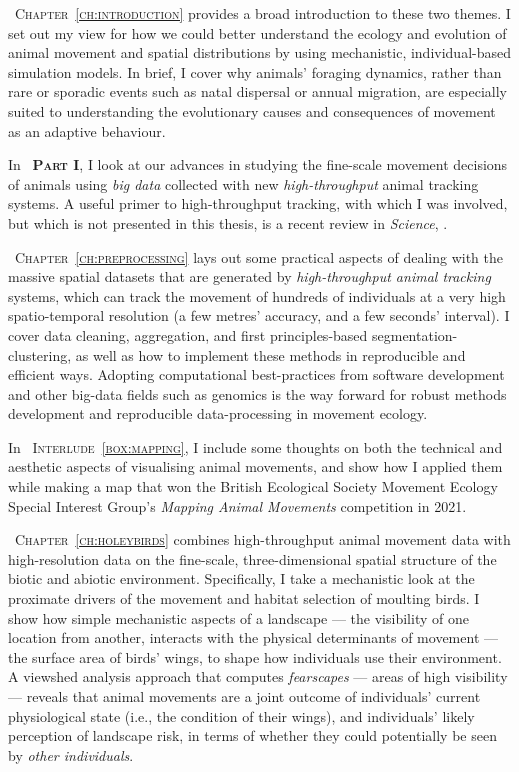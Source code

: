 {\scshape~Chapter~\ref{ch:introduction}} provides a broad introduction to these two themes.
I set out my view for how we could better understand the ecology and evolution of animal movement and spatial distributions by using mechanistic, individual-based simulation models.
In brief, I cover why animals' foraging dynamics, rather than rare or sporadic events such as natal dispersal or annual migration, are especially suited to understanding the evolutionary causes and consequences of movement as an adaptive behaviour.


\medskip

In {\scshape~\textbf{Part I}}, I look at our advances in studying the fine-scale movement decisions of animals using \textit{big data} collected with new \textit{high-throughput} animal tracking systems.
A useful primer to high-throughput tracking, with which I was involved, but which is not presented in this thesis, is a recent review in \textit{Science},  .

\medskip

{\scshape~Chapter~\ref{ch:preprocessing}} lays out some practical aspects of dealing with the massive spatial datasets that are generated by \textit{high-throughput animal tracking} systems, which can track the movement of hundreds of individuals at a very high spatio-temporal resolution (a few metres' accuracy, and a few seconds' interval).
I cover data cleaning, aggregation, and first principles-based segmentation-clustering, as well as how to implement these methods in reproducible and efficient ways.
Adopting computational best-practices from software development and other big-data fields such as genomics is the way forward for robust methods development and reproducible data-processing in movement ecology.

\medskip

In {\scshape~Interlude~\ref{box:mapping}}, I include some thoughts on both the technical and aesthetic aspects of visualising animal movements, and show how I applied them while making a map that won the British Ecological Society Movement Ecology Special Interest Group's \emph{Mapping Animal Movements} competition in 2021.

\medskip

{\scshape~Chapter~\ref{ch:holeybirds}} combines high-throughput animal movement data with high-resolution data on the fine-scale, three-dimensional spatial structure of the biotic and abiotic environment.
Specifically, I take a mechanistic look at the proximate drivers of the movement and habitat selection of moulting birds.
I show how simple mechanistic aspects of a landscape --- the visibility of one location from another, interacts with the physical determinants of movement --- the surface area of birds' wings, to shape how individuals use their environment.
A viewshed analysis approach that computes \textit{fearscapes} --- areas of high visibility --- reveals that animal movements are a joint outcome of individuals' current physiological state (i.e., the condition of their wings), and individuals' likely perception of landscape risk, in terms of whether they could potentially be seen by \textit{other individuals}.

